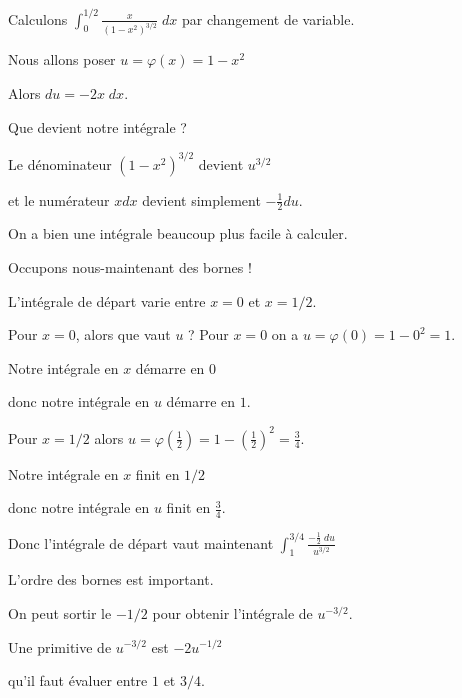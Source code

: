 \diapo


Calculons $\int_0^{1/2}\frac{x}{(1-x^2)^{3/2}} \;dx$ par changement de variable.


\change


Nous allons poser $u=\varphi(x) = 1-x^2$

\change

Alors $du = -2x \; dx$. 

\change

Que devient notre intégrale ?

\change

Le dénominateur $(1-x^2)^{3/2}$ devient $u^{3/2}$

et le numérateur $x dx$ devient simplement $-\frac12 du$.

On a bien une intégrale beaucoup plus facile à calculer.


Occupons nous-maintenant des bornes !

\change

L'intégrale de départ varie entre $x=0$ et $x=1/2$.


Pour $x=0$, alors que vaut $u$ ? Pour $x=0$ on a $u=\varphi(0)=1-0^2=1$.

\change

Notre intégrale en $x$ démarre en $0$ 

\change

donc notre intégrale en $u$ démarre en $1$.

\change

Pour $x=1/2$ alors $u=\varphi(\frac{1}{2})=1-(\frac12)^2=\frac34$.

\change

Notre intégrale en $x$ finit en $1/2$

\change

donc notre intégrale en $u$ finit en $\frac34$.

Donc l'intégrale de départ vaut  maintenant $\int_1^{3/4}\frac{-\tfrac12 \; du}{u^{3/2}} $

L'ordre des bornes est important.

\change

On peut sortir le $-1/2$ pour obtenir l'intégrale de $u^{-3/2}$.

\change

Une primitive de $u^{-3/2}$ est $-2u^{-1/2}$

\change

qu'il faut évaluer entre $1$ et $3/4$.

\change

